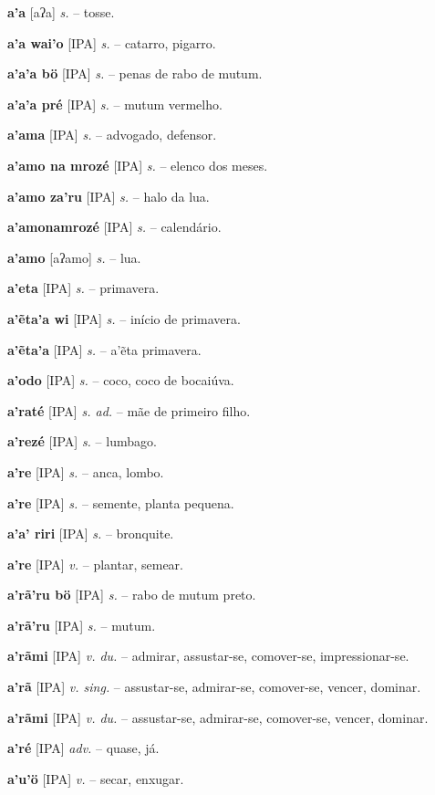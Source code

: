 \textbf{a'a} [aʔa] \textit{s.} -- tosse.

\textbf{a'a wai'o} [IPA] \textit{s.} -- catarro, pigarro.

\textbf{a'a'a bö} [IPA] \textit{s.} -- penas de rabo de mutum.

\textbf{a'a'a pré} [IPA] \textit{s.} -- mutum vermelho.

\textbf{a'ama} [IPA] \textit{s.} -- advogado, defensor.

\textbf{a'amo na mrozé} [IPA] \textit{s.} -- elenco dos meses.

\textbf{a'amo za'ru} [IPA] \textit{s.} -- halo da lua.

\textbf{a'amonamrozé} [IPA] \textit{s.} -- calendário.

\textbf{a'amo} [aʔamo] \textit{s.} -- lua. \href{https://xavante.pythonanywhere.com/static/dicionario/play.html?file=moon.wav}{\faHeadphones}

\textbf{a'eta} [IPA] \textit{s.} -- primavera.

\textbf{a'ẽta'a wi} [IPA] \textit{s.} -- início de primavera.

\textbf{a'ẽta'a} [IPA] \textit{s.} -- a'ẽta primavera.

\textbf{a'odo} [IPA] \textit{s.} -- coco, coco de bocaiúva.

\textbf{a'raté} [IPA] \textit{s. ad.} -- mãe de primeiro filho.

\textbf{a'rezé} [IPA] \textit{s.} -- lumbago.

\textbf{a're} [IPA] \textit{s.} -- anca, lombo.

\textbf{a're} [IPA] \textit{s.} -- semente, planta pequena.

\textbf{a'a' riri} [IPA] \textit{s.} -- bronquite.

\textbf{a're} [IPA] \textit{v.} -- plantar, semear.

\textbf{a'rã'ru bö} [IPA] \textit{s.} -- rabo de mutum preto.

\textbf{a'rã'ru} [IPA] \textit{s.} -- mutum.

\textbf{a'rãmi} [IPA] \textit{v. du.} -- admirar, assustar-se, comover-se, impressionar-se.

\textbf{a'rã} [IPA] \textit{v. sing.} -- assustar-se, admirar-se, comover-se, vencer, dominar.

\textbf{a'rãmi} [IPA] \textit{v. du.} -- assustar-se, admirar-se, comover-se, vencer, dominar.

\textbf{a'ré} [IPA] \textit{adv.} -- quase, já.

\textbf{a'u'ö} [IPA] \textit{v.} -- secar, enxugar.

